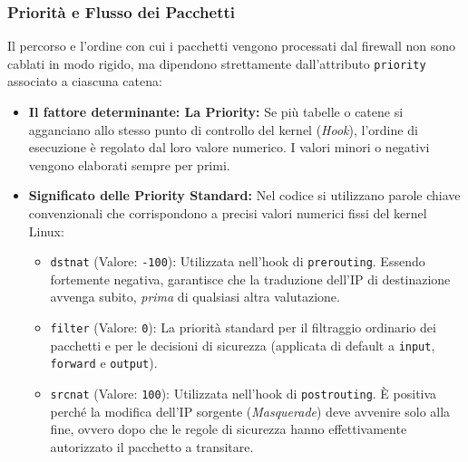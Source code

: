 \documentclass[12pt,a4paper]{report}
\begin{document}
	\subsubsection*{Priorità e Flusso dei Pacchetti}
	Il percorso e l'ordine con cui i pacchetti vengono processati dal firewall non sono cablati in modo rigido, ma dipendono strettamente dall'attributo \texttt{priority} associato a ciascuna catena:
	
	\begin{itemize}
		\item \textbf{Il fattore determinante: La Priority:} Se più tabelle o catene si agganciano allo stesso punto di controllo del kernel (\textit{Hook}), l'ordine di esecuzione è regolato dal loro valore numerico. I valori minori o negativi vengono elaborati sempre per primi.
		
		\item \textbf{Significato delle Priority Standard:} Nel codice si utilizzano parole chiave convenzionali che corrispondono a precisi valori numerici fissi del kernel Linux:
		\begin{itemize}
			\item \texttt{dstnat} (Valore: \texttt{-100}): Utilizzata nell'hook di \texttt{prerouting}. Essendo fortemente negativa, garantisce che la traduzione dell'IP di destinazione avvenga subito, \textit{prima} di qualsiasi altra valutazione.
			\item \texttt{filter} (Valore: \texttt{0}): La priorità standard per il filtraggio ordinario dei pacchetti e per le decisioni di sicurezza (applicata di default a \texttt{input}, \texttt{forward} e \texttt{output}).
			\item \texttt{srcnat} (Valore: \texttt{100}): Utilizzata nell'hook di \texttt{postrouting}. È positiva perché la modifica dell'IP sorgente (\textit{Masquerade}) deve avvenire solo alla fine, ovvero dopo che le regole di sicurezza hanno effettivamente autorizzato il pacchetto a transitare.
		\end{itemize}
		

\end{itemize}
\end{document}
